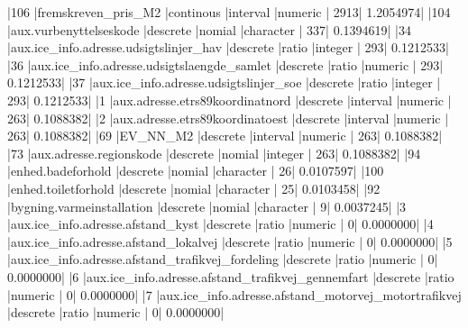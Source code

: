 \documentclass{report}
\begin{document}
\begin{Schunk}
\begin{Soutput}
|106 |fremskreven_pris_M2                                           |continous          |interval       |numeric         |           2913|          1.2054974|
|104 |aux.vurbenyttelseskode                                        |descrete           |nomial         |character       |            337|          0.1394619|
|34  |aux.ice_info.adresse.udsigtslinjer_hav                        |descrete           |ratio          |integer         |            293|          0.1212533|
|36  |aux.ice_info.adresse.udsigtslaengde_samlet                    |descrete           |ratio          |numeric         |            293|          0.1212533|
|37  |aux.ice_info.adresse.udsigtslinjer_soe                        |descrete           |ratio          |integer         |            293|          0.1212533|
|1   |aux.adresse.etrs89koordinatnord                               |descrete           |interval       |numeric         |            263|          0.1088382|
|2   |aux.adresse.etrs89koordinatoest                               |descrete           |interval       |numeric         |            263|          0.1088382|
|69  |EV_NN_M2                                                      |descrete           |interval       |numeric         |            263|          0.1088382|
|73  |aux.adresse.regionskode                                       |descrete           |nomial         |integer         |            263|          0.1088382|
|94  |enhed.badeforhold                                             |descrete           |nomial         |character       |             26|          0.0107597|
|100 |enhed.toiletforhold                                           |descrete           |nomial         |character       |             25|          0.0103458|
|92  |bygning.varmeinstallation                                     |descrete           |nomial         |character       |              9|          0.0037245|
|3   |aux.ice_info.adresse.afstand_kyst                             |descrete           |ratio          |numeric         |              0|          0.0000000|
|4   |aux.ice_info.adresse.afstand_lokalvej                         |descrete           |ratio          |numeric         |              0|          0.0000000|
|5   |aux.ice_info.adresse.afstand_trafikvej_fordeling              |descrete           |ratio          |numeric         |              0|          0.0000000|
|6   |aux.ice_info.adresse.afstand_trafikvej_gennemfart             |descrete           |ratio          |numeric         |              0|          0.0000000|
|7   |aux.ice_info.adresse.afstand_motorvej_motortrafikvej          |descrete           |ratio          |numeric         |              0|          0.0000000|

\end{Soutput}
\end{Schunk}
\end{document}
